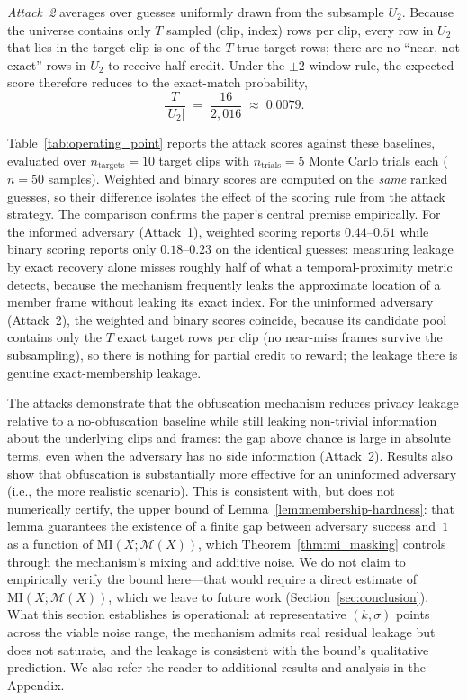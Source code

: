 \documentclass[letterpaper]{article} %
\newcommand{\MI}{\mathrm{MI}}
\begin{document}
\emph{Attack~2} averages over guesses uniformly drawn from the subsample $U_2$. Because the universe contains only $T$ sampled (clip, index) rows per clip, every row in $U_2$ that lies in the target clip is one of the $T$ true target rows; there are no ``near, not exact'' rows in $U_2$ to receive half credit. Under the $\pm 2$-window rule, the expected score therefore reduces to the exact-match probability,
\[
\frac{T}{|U_2|} \;=\; \frac{16}{2{,}016} \;\approx\; 0.0079.
\]

Table~\ref{tab:operating_point} reports the attack scores against these baselines, evaluated over $n_{\mathrm{targets}} = 10$ target clips with $n_{\mathrm{trials}} = 5$ Monte Carlo trials each ($n = 50$ samples). Weighted and binary scores are computed on the \emph{same} ranked guesses, so their difference isolates the effect of the scoring rule from the attack strategy. The comparison confirms the paper's central premise empirically. For the informed adversary (Attack~1), weighted scoring reports $0.44$--$0.51$ while binary scoring reports only $0.18$--$0.23$ on the identical guesses: measuring leakage by exact recovery alone misses roughly half of what a temporal-proximity metric detects, because the mechanism frequently leaks the approximate location of a member frame without leaking its exact index. For the uninformed adversary (Attack~2), the weighted and binary scores coincide, because its candidate pool contains only the $T$ exact target rows per clip (no near-miss frames survive the subsampling), so there is nothing for partial credit to reward; the leakage there is genuine exact-membership leakage.

The attacks demonstrate that the obfuscation mechanism reduces privacy leakage relative to a no-obfuscation baseline while still leaking non-trivial information about the underlying clips and frames: the gap above chance is large in absolute terms, even when the adversary has no side information (Attack~2). Results also show that obfuscation is substantially more effective for an uninformed adversary (i.e., the more realistic scenario). This is consistent with, but does not numerically certify, the upper bound of Lemma~\ref{lem:membership-hardness}: that lemma guarantees the existence of a finite gap between adversary success and~$1$ as a function of $\MI(X; \mathcal{M}(X))$, which Theorem~\ref{thm:mi_masking} controls through the mechanism's mixing and additive noise. We do not claim to empirically verify the bound here---that would require a direct estimate of $\MI(X; \mathcal{M}(X))$, which we leave to future work (Section~\ref{sec:conclusion}). What this section establishes is operational: at representative $(k, \sigma)$ points across the viable noise range, the mechanism admits real residual leakage but does not saturate, and the leakage is consistent with the bound's qualitative prediction. We also refer the reader to additional results and analysis in the Appendix.
\end{document}
